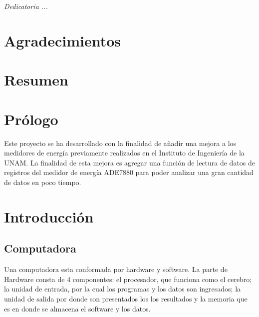 \documentclass[letterpaper,12pt,oneside]{book}
\author{Luis Esteban Serrano Bermúdez}
\title{}
\begin{document}
	\frontmatter
	\maketitle
	\chapter*{}

	\begin{flushright}
	  \emph{Dedicatoria ...} 
	  \thispagestyle{empty}
	\end{flushright}

	\chapter{Agradecimientos}

	\chapter{Resumen}

	\tableofcontents
	\listoffigures
	\listoftables

	\chapter{Prólogo}
    Este proyecto se ha desarrollado con la finalidad de añadir una mejora a los medidores de energía previamente realizados en el Instituto de Ingeniería de la UNAM. La finalidad de esta mejora es agregar una función de lectura de datos de registros del medidor de energía ADE7880 para poder analizar una gran cantidad de datos en poco tiempo.

	\mainmatter

	\chapter{Introducción}

		\section{Computadora}
		Una computadora esta conformada por hardware y software. La parte de Hardware consta de 4 componentes: el procesador, que funciona como el cerebro; la unidad de entrada, por la cual los programas y los datos son ingresados; la unidad de salida por donde son presentados los los resultados y la memoria que es en donde se almacena el software y los datos.
\end{document}
